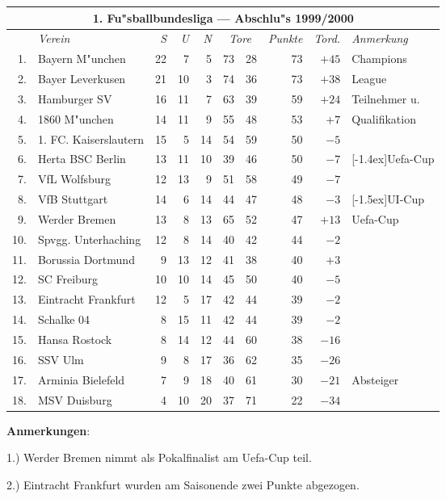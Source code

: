 \documentclass{article}
\begin{document}
\begin{tabular}{|r|l||rrr|r@{:}l|r|r||l|}\hline
\multicolumn{10}{|c|}{\rule[-3mm]{0mm}{8mm}\textbf{1. Fu"sballbundesliga ---
   Abschlu"s 1999/2000}}\\ \hline
& \emph{Verein} & \emph{S} & \emph{U} & \emph{N}  
   & \multicolumn{2}{c|}{\emph{Tore}} & \emph{Punkte} & \emph{Tord.} 
   & \emph{Anmerkung}\\ \hline
1. & Bayern M"unchen       & 22 & 7  & 5  & 73&28 & 73 & $+45$
   & Champions       \\ \cline{1-9}
2. & Bayer Leverkusen      & 21 & 10 & 3  & 74&36 & 73 & $+38$ 
   & League          \\ \cline{1-9}
3. & Hamburger SV          & 16 & 11 & 7  & 63&39 & 59 & $+24$ 
   & Teilnehmer u.   \\ \cline{1-9}
4. & 1860 M"unchen         & 14 & 11 &  9 & 55&48 & 53 & $+7$ 
   & Qualifikation   \\ \hline
5. & 1. FC. Kaiserslautern & 15 &  5 & 14 & 54&59 & 50 & $-5$
   &                 \\ \cline{1-9}
6. & Herta BSC Berlin      & 13 & 11 & 10 & 39&46 & 50 & $-7$
   & \raisebox{1.5ex}[-1.4ex]{Uefa-Cup} \\ \hline
7. & VfL Wolfsburg         & 12 & 13 &  9 & 51&58 & 49 & $-7$
   &                 \\ \cline{1-9}
8. & VfB Stuttgart         & 14 &  6 & 14 & 44&47 & 48 & $-3$
   & \raisebox{1.5ex}[-1.5ex]{UI-Cup}   \\ \hline
9. & Werder Bremen         & 13 &  8 & 13 & 65&52 & 47 & $+13$
   & Uefa-Cup        \\ \hline
10.& Spvgg. Unterhaching   & 12 &  8 & 14 & 40&42 & 44 & $-2$
   &                 \\ \cline{1-9}
11.& Borussia Dortmund     &  9 & 13 & 12 & 41&38 & 40 & $+3$
   &                 \\ \cline{1-9}
12.& SC Freiburg           & 10 & 10 & 14 & 45&50 & 40 & $-5$
   &                 \\ \cline{1-9}
13.& Eintracht Frankfurt   & 12 &  5 & 17 & 42&44 & 39 & $-2$
   &                 \\ \cline{1-9}
14.& Schalke 04            &  8 & 15 & 11 & 42&44 & 39 & $-2$
   &                 \\ \cline{1-9}
15.& Hansa Rostock         &  8 & 14 & 12 & 44&60 & 38 & $-16$
   &                 \\ \hline
16.& SSV Ulm               &  9 &  8 & 17 & 36&62 & 35 & $-26$
   &                 \\ \cline{1-9}
17.& Arminia Bielefeld     &  7 &  9 & 18 & 40&61 & 30 & $-21$
   & Absteiger       \\ \cline{1-9}
18.& MSV Duisburg          &  4 & 10 & 20 & 37&71 & 22 & $-34$
   &                 \\ \hline
\end{tabular}

\textbf{Anmerkungen}:

1.) Werder Bremen nimmt als Pokalfinalist am Uefa-Cup teil.

2.) Eintracht Frankfurt wurden am Saisonende zwei Punkte abgezogen.
\end{document}
